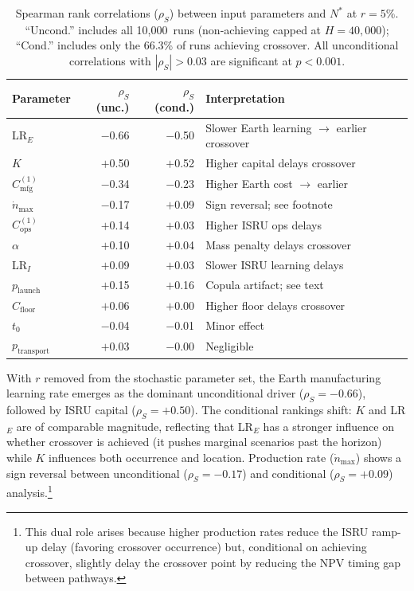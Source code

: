 \documentclass[preprint,12pt]{elsarticle}
\begin{document}
\begin{table}[htbp]
\centering
\caption{Spearman rank correlations ($\rho_S$) between input parameters and $N^*$ at $r = 5\%$. ``Uncond.'' includes all 10{,}000~runs (non-achieving capped at $H = 40{,}000$); ``Cond.'' includes only the 66.3\% of runs achieving crossover. All unconditional correlations with $|\rho_S| > 0.03$ are significant at $p < 0.001$.}
\label{tab:spearman}
\begin{tabular}{@{}lrrp{4.5cm}@{}}
\toprule
Parameter & $\rho_S$ (unc.) & $\rho_S$ (cond.) & Interpretation \\
\midrule
LR$_E$     & $-$0.66 & $-$0.50 & Slower Earth learning $\rightarrow$ earlier crossover \\
$K$               & $+$0.50 & $+$0.52 & Higher capital delays crossover \\
$C_{\mathrm{mfg}}^{(1)}$ & $-$0.34 & $-$0.23 & Higher Earth cost $\rightarrow$ earlier \\
$\dot{n}_{\max}$ & $-$0.17 & $+$0.09 & Sign reversal; see footnote \\
$C_{\mathrm{ops}}^{(1)}$ & $+$0.14 & $+$0.03 & Higher ISRU ops delays \\
$\alpha$          & $+$0.10 & $+$0.04 & Mass penalty delays crossover \\
LR$_I$      & $+$0.09 & $+$0.03 & Slower ISRU learning delays \\
$p_{\mathrm{launch}}$   & $+$0.15 & $+$0.16 & Copula artifact; see text \\
$C_{\mathrm{floor}}$ & $+$0.06 & $+$0.00 & Higher floor delays crossover \\
$t_0$             & $-$0.04 & $-$0.01 & Minor effect \\
$p_{\mathrm{transport}}$ & $+$0.03 & $-$0.00 & Negligible \\
\bottomrule
\end{tabular}
\end{table}

With $r$ removed from the stochastic parameter set, the Earth manufacturing learning rate emerges as the dominant unconditional driver ($\rho_S = -0.66$), followed by ISRU capital ($\rho_S = +0.50$). The conditional rankings shift: $K$ and LR$_E$ are of comparable magnitude, reflecting that LR$_E$ has a stronger influence on whether crossover is achieved (it pushes marginal scenarios past the horizon) while $K$ influences both occurrence and location. Production rate ($\dot{n}_{\max}$) shows a sign reversal between unconditional ($\rho_S = -0.17$) and conditional ($\rho_S = +0.09$) analysis.\footnote{This dual role arises because higher production rates reduce the ISRU ramp-up delay (favoring crossover occurrence) but, conditional on achieving crossover, slightly delay the crossover point by reducing the NPV timing gap between pathways.}
\end{document}

